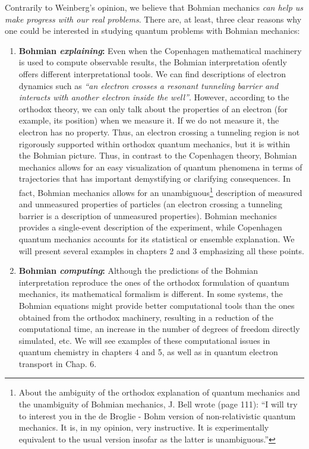 \documentclass[nofootinbib, secnumarabic, amsmath, nobibnotes,11pt,aps,pra, floatfix]{revtex4-1}
\begin{document}
Contrarily to Weinberg's opinion, we believe that Bohmian mechanics \emph{can help us make progress with our real problems}. There are, at least, three clear reasons why one could be interested in studying quantum problems with Bohmian mechanics:
\begin{enumerate}
\item \textbf{Bohmian \emph{explaining}:} Even when the Copenhagen mathematical machinery is used to compute observable results, the Bohmian interpretation ofently offers different interpretational tools. We can find descriptions of electron dynamics such as \emph{``an electron crosses a resonant tunneling barrier and interacts with another electron inside the well''}. However, according to the orthodox theory, we can only talk about the properties of an electron (for example, its position) when we measure it. If we do not measure it, the electron has no property. Thus, an electron crossing a tunneling region is not rigorously supported within orthodox quantum mechanics, but it is within the Bohmian picture.
Thus, in contrast to the Copenhagen theory, Bohmian mechanics allows for an easy visualization of quantum phenomena in terms of trajectories that has important demystifying or clarifying consequences. In fact, Bohmian mechanics allows for an unambiguous\footnote{About the ambiguity of the orthodox explanation of quantum mechanics and the unambiguity of Bohmian mechanics, J. Bell wrote\cite{om.Bell1987} (page 111): ``I will try to interest you in the de Broglie - Bohm version of non-relativistic quantum mechanics. It is, in my opinion, very instructive. It is experimentally equivalent to the usual version insofar as the latter is unambiguous.''} description of measured and unmeasured properties of particles (an electron crossing a tunneling barrier is a description of unmeasured properties). Bohmian mechanics provides a single-event description of the experiment, while Copenhagen quantum mechanics accounts for its statistical or ensemble explanation. We will present several examples in chapters 2 and 3 emphasizing all these points. \\

\item \textbf{Bohmian \emph{computing}:} Although the predictions of the Bohmian interpretation reproduce the ones of the orthodox formulation of quantum mechanics, its mathematical formalism is different. In some systems, the Bohmian equations might provide better computational tools than the ones obtained from the orthodox machinery, resulting in a reduction of the computational time, an increase in the number of degrees of freedom directly simulated, etc.  We will see examples of these computational issues in quantum chemistry in chapters 4 and 5, as well as in quantum electron transport in Chap. 6.\\



\end{enumerate}
\end{document}
